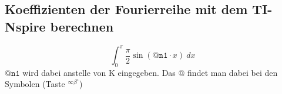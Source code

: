 \subsection{Koeffizienten der Fourierreihe mit dem TI-Nspire berechnen}
\[ \int_{\boxed{0}}^{\boxed{\pi}}\boxed{\frac{\pi}{2}\sin(\mathtt{@n1} \cdot x)}~d\boxed{x} \]
$\mathtt{@n1}$ wird dabei anstelle von K eingegeben. Das $\mathtt{@}$ findet man dabei bei den Symbolen (Taste $\boxed{\boxed{^{\infty \beta ^\circ}}}$)
\fi
